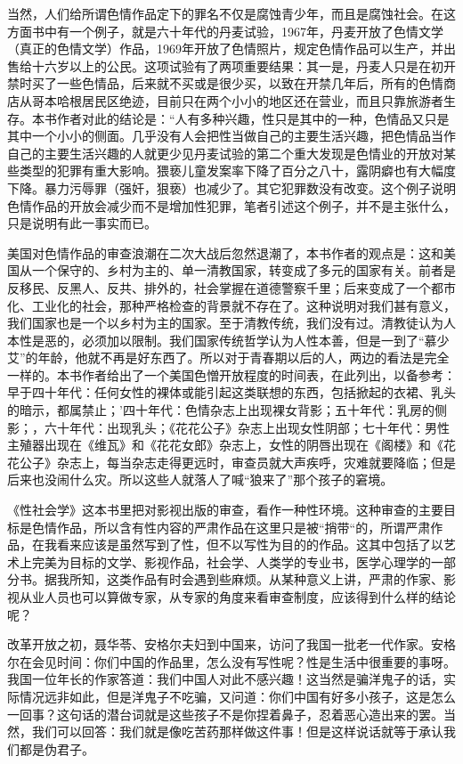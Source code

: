 当然，人们给所谓色情作品定下的罪名不仅是腐蚀青少年，而且是腐蚀社会。在这方面书中有一个例子，就是六十年代的丹麦试验，1967年，丹麦开放了色情文学（真正的色情文学）作品，1969年开放了色情照片，规定色情作品可以生产，并出售给十六岁以上的公民。这项试验有了两项重要结果：其一是，丹麦人只是在初开禁时买了一些色情品，后来就不买或是很少买，以致在开禁几年后，所有的色情商店从哥本哈根居民区绝迹，目前只在两个小小的地区还在营业，而且只靠旅游者生存。本书作者对此的结论是：“人有多种兴趣，性只是其中的一种，色情品又只是其中一个小小的侧面。几乎没有人会把性当做自己的主要生活兴趣，把色情品当作自己的主要生活兴趣的人就更少见丹麦试验的第二个重大发现是色情业的开放对某些类型的犯罪有重大影响。猥亵儿童发案率下降了百分之八十，露阴癖也有大幅度下降。暴力污辱罪（强奸，狠亵）也减少了。其它犯罪数没有改变。这个例子说明色情作品的开放会减少而不是增加性犯罪，笔者引述这个例子，并不是主张什么，只是说明有此一事实而已。 

美国对色情作品的审查浪潮在二次大战后忽然退潮了，本书作者的观点是：这和美国从一个保守的、乡村为主的、单一清教国家，转变成了多元的国家有关。前者是反移民、反黑人、反共、排外的，社会掌握在道德警察千里；后来变成了一个都市化、工业化的社会，那种严格检查的背景就不存在了。这种说明对我们甚有意义，我们国家也是一个以乡村为主的国家。至于清教传统，我们没有过。清教徒认为人本性是恶的，必须加以限制。我们国家传统哲学认为人性本善，但是一到了“慕少艾”的年龄，他就不再是好东西了。所以对于青春期以后的人，两边的看法是完全一样的。本书作者给出了一个美国色憎开放程度的时间表，在此列出，以备参考：早于四十年代：任何女性的裸体或能引起这类联想的东西，包括掀起的衣裙、乳头的暗示，都属禁止；’四十年代：色情杂志上出现裸女背影；五十年代：乳房的侧影；，六十年代：出现乳头；《花花公子》杂志上出现女性阴部；七十年代：男性主殖器出现在《维瓦》和《花花女郎》杂志上，女性的阴唇出现在《阁楼》和《花花公子》杂志上，每当杂志走得更远时，审查员就大声疾呼，灾难就要降临；但是后来也没闹什么灾。所以这些人就落人了喊“狼来了”那个孩子的窘境。 

《性社会学》这本书里把对影视出版的审查，看作一种性环境。这种审查的主要目标是色情作品，所以含有性内容的严肃作品在这里只是被“捎带“的，所谓严肃作品，在我看来应该是虽然写到了性，但不以写性为目的的作品。这其中包括了以艺术上完美为目标的文学、影视作品，社会学、人类学的专业书，医学心理学的一部分书。据我所知，这类作品有时会遇到些麻烦。从某种意义上讲，严肃的作家、影视从业人员也可以算做专家，从专家的角度来看审查制度，应该得到什么样的结论呢？ 

改革开放之初，聂华苓、安格尔夫妇到中国来，访问了我国一批老一代作家。安格尔在会见时间：你们中国的作品里，怎么没有写性呢？性是生活中很重要的事呀。我国一位年长的作家答道：我们中国人对此不感兴趣！这当然是骗洋鬼子的话，实际情况远非如此，但是洋鬼子不吃骗，又问道：你们中国有好多小孩子，这是怎么一回事？这句话的潜台词就是这些孩子不是你捏着鼻子，忍着恶心造出来的罢。当然，我们可以回答：我们就是像吃苦药那样做这件事！但是这样说话就等于承认我们都是伪君子。 

